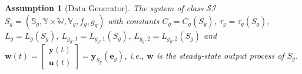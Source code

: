 \documentclass{ifacconf}
\def\rve{{\mathbf{e}}}
\def\rvu{{\mathbf{i}}}
\def\rvs{{\mathbf{s}}}
\def\rvu{{\mathbf{u}}}
\def\rvv{{\mathbf{v}}}
\def\rvw{{\mathbf{w}}}
\def\rvy{{\mathbf{y}}}
\def\sS{{\mathbb{S}}}
\def\sV{{\mathbb{V}}}
\def\sW{{\mathbb{W}}}
\def\sY{{\mathbb{Y}}}
\def\sZ{{\mathbb{Z}}}
\newtheorem{Assumption}{Assumption}[section]
\newcommand{\class}{\(\mathcal{SI}\)}
\begin{document}
\begin{Assumption}[Data Generator]
\label{as:generator}
The system of class \class{} $S_g=(\sS_g,\sY \times \sW, \sV_g,f_g,g_g)$ with constants $C_g=C_g(S_g)$, $\tau_g=\tau_g(S_g)$, $L_{g}=L_{g}(S_g)$, $L_{g_g,1}=L_{g_g,1}(S_g)$, $L_{g_g,2}=L_{g_g,2}(S_g)$ and $\rvw(t)=\begin{bmatrix} \rvy(t)\\\rvu(t)\end{bmatrix}=\rvy_{S_g}(\rve_g)$, i.e., $\rvw$ is the steady-state output process of $S_g$.
\end{Assumption}
\end{document}
